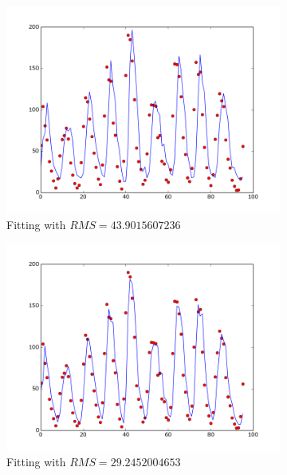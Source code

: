 \documentclass{article}
\begin{document}
\begin{figure}[!h]
    \centering
    \begin{subfigure}[b]{0.47\textwidth}
        \includegraphics[width=\textwidth]{Part2/II211.png}
        \caption{Fitting with $RMS = 43.9015607236$}
    \end{subfigure}
    \begin{subfigure}[b]{0.47\textwidth}
        \includegraphics[width=\textwidth]{Part2/II212.png}
        \caption{Fitting with $RMS = 29.2452004653$}
    \end{subfigure}
    \begin{subfigure}[b]{0.47\textwidth}

\end{subfigure}
\end{figure}
\end{document}
